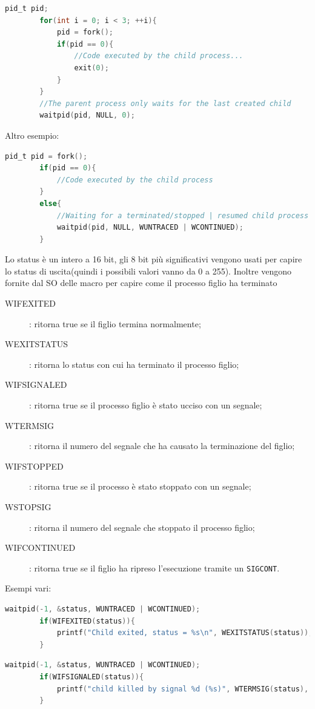\documentclass[a4paper, 12pt]{book}
\begin{document}
    \begin{lstlisting}[language=C]
        pid_t pid;
        for(int i = 0; i < 3; ++i){
            pid = fork();
            if(pid == 0){
                //Code executed by the child process... 
                exit(0);
            }
        }
        //The parent process only waits for the last created child 
        waitpid(pid, NULL, 0);
    \end{lstlisting}
    Altro esempio:
    \begin{lstlisting}[language=C]
        pid_t pid = fork();
        if(pid == 0){
            //Code executed by the child process
        }
        else{
            //Waiting for a terminated/stopped | resumed child process 
            waitpid(pid, NULL, WUNTRACED | WCONTINUED);
        }
    \end{lstlisting}
    Lo status è un intero a 16 bit, gli 8 bit più significativi vengono 
    usati per capire lo status di uscita(quindi i possibili valori vanno da 0 a 255).
    Inoltre vengono fornite dal SO delle macro per capire come il processo figlio ha 
    terminato 
    \begin{description}
        \item[WIFEXITED]: ritorna true se il figlio termina normalmente;
        \item[WEXITSTATUS]: ritorna lo status con cui ha terminato il processo figlio;
        \item[WIFSIGNALED]: ritorna true se il processo figlio è stato ucciso con un segnale;
        \item[WTERMSIG]: ritorna il numero del segnale che ha causato la terminazione del figlio;
        \item[WIFSTOPPED]:   ritorna true se il processo è stato stoppato con un segnale;
        \item[WSTOPSIG]: ritorna il numero del segnale che stoppato il processo figlio;
        \item[WIFCONTINUED]: ritorna true se il figlio ha ripreso l'esecuzione tramite un \verb|SIGCONT|.         
    \end{description}
    Esempi vari:
    \begin{lstlisting}[language=C]
        waitpid(-1, &status, WUNTRACED | WCONTINUED);
        if(WIFEXITED(status)){
            printf("Child exited, status = %s\n", WEXITSTATUS(status));
        }
    \end{lstlisting}
    \begin{lstlisting}[language=C]
        waitpid(-1, &status, WUNTRACED | WCONTINUED);
        if(WIFSIGNALED(status)){
            printf("child killed by signal %d (%s)", WTERMSIG(status), strsignal(WTERMSIG(status)));
        }
    \end{lstlisting}
\end{document}

